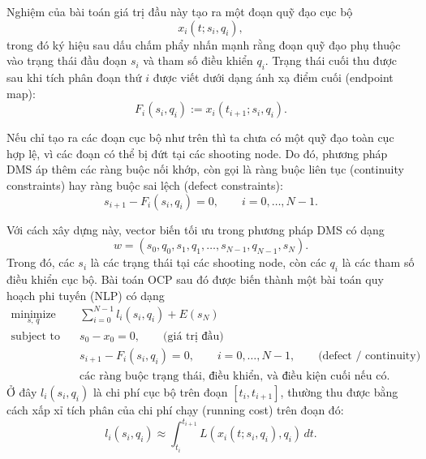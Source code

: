 Nghiệm của bài toán giá trị đầu này tạo ra một đoạn quỹ đạo cục bộ
\[
x_i(t;s_i,q_i),
\]
trong đó ký hiệu sau dấu chấm phẩy nhấn mạnh rằng đoạn quỹ đạo phụ thuộc vào trạng thái đầu đoạn
$s_i$ và tham số điều khiển $q_i$.
Trạng thái cuối thu được sau khi tích phân đoạn thứ $i$ được viết dưới dạng ánh xạ điểm cuối
(endpoint map):
\begin{equation}
F_i(s_i,q_i)
:=
x_i(t_{i+1};s_i,q_i).
\label{eq:endpoint_map_DMS}
\end{equation}

Nếu chỉ tạo ra các đoạn cục bộ như trên thì ta chưa có một quỹ đạo toàn cục hợp lệ, vì các đoạn
có thể bị đứt tại các shooting node.
Do đó, phương pháp DMS áp thêm các ràng buộc nối khớp, còn gọi là ràng buộc liên tục (continuity
constraints) hay ràng buộc sai lệch (defect constraints):
\begin{equation}
s_{i+1}-F_i(s_i,q_i)=0,
\qquad i=0,\ldots,N-1.
\label{eq:defect_constraint_DMS}
\end{equation}

Với cách xây dựng này, vector biến tối ưu trong phương pháp DMS có dạng
\begin{equation}
w=(s_0,q_0,s_1,q_1,\ldots,s_{N-1},q_{N-1},s_N).
\label{eq:DMS_decision_vector}
\end{equation}
Trong đó, các $s_i$ là các trạng thái tại các shooting node, còn các $q_i$ là các tham số điều khiển
cục bộ.
Bài toán OCP sau đó được biến thành một bài toán quy hoạch phi tuyến (NLP) có dạng
\begin{equation}
\begin{aligned}
\underset{s,\,q}{\text{minimize}}
\quad &
\sum_{i=0}^{N-1} l_i(s_i,q_i)+E(s_N)
\\
\text{subject to}
\quad &
s_0-x_0=0,
\qquad \text{(giá trị đầu)}
\\
&
s_{i+1}-F_i(s_i,q_i)=0,
\qquad i=0,\ldots,N-1,
\qquad \text{(defect / continuity)}
\\
&
\text{các ràng buộc trạng thái, điều khiển, và điều kiện cuối nếu có.}
\end{aligned}
\label{eq:DMS_nlp_general}
\end{equation}
Ở đây $l_i(s_i,q_i)$ là chi phí cục bộ trên đoạn $[t_i,t_{i+1}]$, thường thu được bằng cách
xấp xỉ tích phân của chi phí chạy (running cost) trên đoạn đó:
\begin{equation}
l_i(s_i,q_i)
\approx
\int_{t_i}^{t_{i+1}}
L(x_i(t;s_i,q_i),q_i)\,dt.
\label{eq:local_cost_DMS}
\end{equation}

